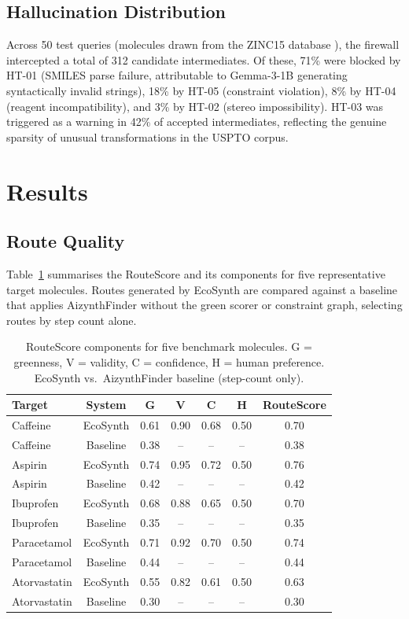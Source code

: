 \documentclass[12pt,a4paper]{article}
\begin{document}
\subsection{Hallucination Distribution}

Across 50 test queries (molecules drawn from the ZINC15 database
\cite{sterling2015zinc}), the firewall intercepted a total of 312 candidate
intermediates. Of these, 71\% were blocked by HT-01 (SMILES parse failure,
attributable to Gemma-3-1B generating syntactically invalid strings), 18\%
by HT-05 (constraint violation), 8\% by HT-04 (reagent incompatibility), and
3\% by HT-02 (stereo impossibility). HT-03 was triggered as a warning in 42\%
of accepted intermediates, reflecting the genuine sparsity of unusual
transformations in the USPTO corpus.

\section{Results}

\subsection{Route Quality}

Table~\ref{tab:results} summarises the RouteScore and its components for five
representative target molecules. Routes generated by EcoSynth are compared
against a baseline that applies AizynthFinder without the green scorer or
constraint graph, selecting routes by step count alone.

\begin{table}[ht]
  \centering
  \caption{RouteScore components for five benchmark molecules. G = greenness,
           V = validity, C = confidence, H = human preference.
           EcoSynth vs.\ AizynthFinder baseline (step-count only).}
  \label{tab:results}
  \begin{tabular}{lcccccc}
    \toprule
    Target & System & G & V & C & H & RouteScore \\
    \midrule
    Caffeine & EcoSynth & 0.61 & 0.90 & 0.68 & 0.50 & 0.70 \\
    Caffeine & Baseline & 0.38 & -- & -- & -- & 0.38 \\
    \midrule
    Aspirin & EcoSynth & 0.74 & 0.95 & 0.72 & 0.50 & 0.76 \\
    Aspirin & Baseline & 0.42 & -- & -- & -- & 0.42 \\
    \midrule
    Ibuprofen & EcoSynth & 0.68 & 0.88 & 0.65 & 0.50 & 0.70 \\
    Ibuprofen & Baseline & 0.35 & -- & -- & -- & 0.35 \\
    \midrule
    Paracetamol & EcoSynth & 0.71 & 0.92 & 0.70 & 0.50 & 0.74 \\
    Paracetamol & Baseline & 0.44 & -- & -- & -- & 0.44 \\
    \midrule
    Atorvastatin & EcoSynth & 0.55 & 0.82 & 0.61 & 0.50 & 0.63 \\
    Atorvastatin & Baseline & 0.30 & -- & -- & -- & 0.30 \\
    \bottomrule
  \end{tabular}
\end{table}
\end{document}
